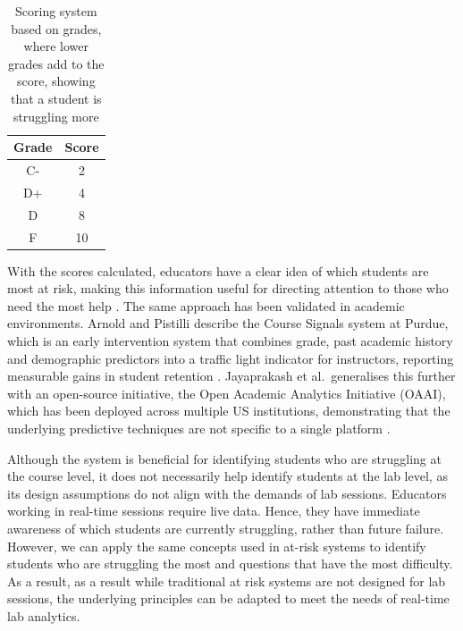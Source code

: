 \begin{table}[H]
    \centering
    \begin{tabular}{|c|c|}
        \hline
        Grade & Score\\
        \hline
        \hline
        C- & 2 \\
        \hline
        D+ & 4\\
        \hline
        D & 8\\
        \hline
        F & 10\\
        \hline
    \end{tabular}
    \caption{Scoring system based on grades, where lower grades add to the score, showing that a student is struggling more}
    \label{tab: grade scoring}
\end{table}
With the scores calculated, educators have a clear idea of which students are most at risk, making this information useful for directing attention to those who need the most help \cite{a2020_atrisk}.
The same approach has been validated in academic environments. Arnold and Pistilli describe the Course Signals system at Purdue, which is an early intervention system that combines grade, past academic history and demographic predictors into a traffic light indicator for instructors, reporting measurable gains in student retention \cite{arnoldCourseSignalsPurdue2012a}.
Jayaprakash et al.\ generalises this further with an open-source initiative, the Open Academic Analytics Initiative (OAAI), which has been deployed across multiple US institutions, demonstrating that the underlying predictive techniques are not specific to a single platform \cite{jayaprakashEarlyAlertAcademically2014}.


Although the system is beneficial for identifying students who are struggling at the course level, it does not necessarily help identify students at the lab level, as its design assumptions do not align with the demands of lab sessions. Educators working in real-time sessions require live data. Hence, they have immediate awareness of which students are currently struggling, rather than future failure. However, we can apply the same concepts used in at-risk systems to identify students who are struggling the most and questions that have the most difficulty. As a result, as a result while traditional at risk systems are not designed for lab sessions, the underlying principles can be adapted to meet the needs of real-time lab analytics.



